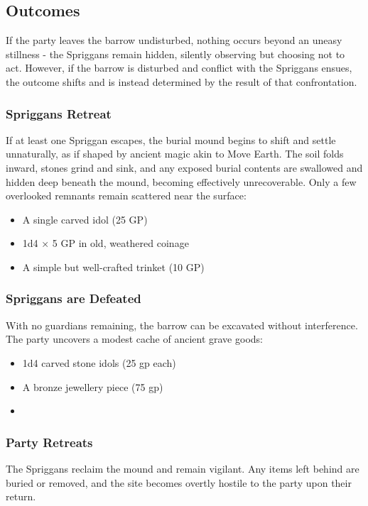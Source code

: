 \subsection*{Outcomes}
{\entryfont If the party leaves the barrow undisturbed, nothing occurs beyond an uneasy stillness - the Spriggans remain hidden, silently observing but choosing not to act. However, if the barrow is disturbed and conflict with the Spriggans ensues, the outcome shifts and is instead determined by the result of that confrontation.}
\subsubsection*{Spriggans Retreat}
{\entryfont If at least one Spriggan escapes, the burial mound begins to shift and settle unnaturally, as if shaped by ancient magic akin to Move Earth. The soil folds inward, stones grind and sink, and any exposed burial contents are swallowed and hidden deep beneath the mound, becoming effectively unrecoverable. Only a few overlooked remnants remain scattered near the surface:
\begin{itemize}
	\item A single carved idol (25 GP)
	\item 1d4 × 5 GP in old, weathered coinage
	\item A simple but well-crafted trinket (10 GP)
\end{itemize}}
\subsubsection*{Spriggans are Defeated}
{\entryfont With no guardians remaining, the barrow can be excavated without interference. The party uncovers a modest cache of ancient grave goods:
\begin{itemize}
	\item 1d4 carved stone idols (25 gp each)
	\item A bronze jewellery piece (75 gp)
	\item \hyperref[mi:OvergrownBarkshield]{}
\end{itemize}}
\subsubsection*{Party Retreats}
{\entryfont The Spriggans reclaim the mound and remain vigilant. Any items left behind are buried or removed, and the site becomes overtly hostile to the party upon their return.}